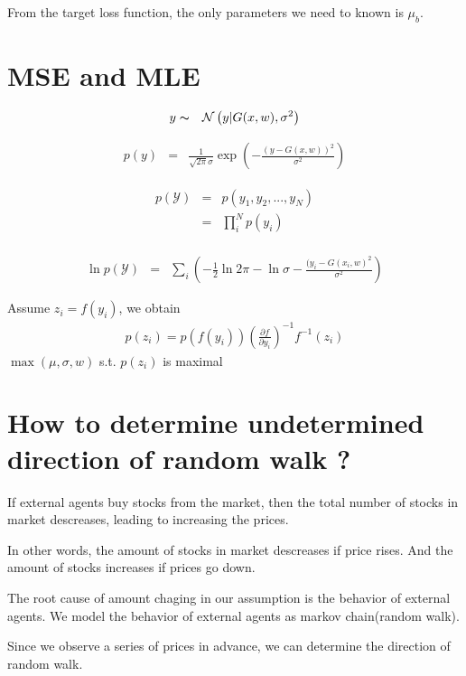 \documentclass[11pt]{article}
\begin{document}
From the target loss function, the only parameters we need to known is \(\mu_b\).
\section{MSE and MLE}
\label{sec:org63f4234}

\begin{eqnarray}
y &\thicksim& \mathcal{N} \left( y | G(x, w), \sigma^2 \right)
\end{eqnarray}

\begin{eqnarray}
p(y) &=& \frac{1}{\sqrt{2 \pi} \sigma} \exp \left(-\frac{(y-G(x, w))^2}{\sigma^2} \right)
\end{eqnarray}

\begin{eqnarray}
p(\mathcal{Y}) &=& p (y_1, y_2, ..., y_N) \\
               &=& \prod_{i}^N p(y_i) \\
\end{eqnarray}

\begin{eqnarray}
\ln p(\mathcal{Y}) &=& \sum_{i} \left( -\frac{1}{2}\ln 2 \pi - \ln \sigma - \frac{(y_i - G(x_i, w)^2}{\sigma^2} \right)
\end{eqnarray}

Assume \(z_i = f(y_i)\), we obtain
\begin{eqnarray}
p(z_i) = p(f(y_i)) \left(\frac{\partial f}{\partial y_i}\right)^{-1} f^{-1}(z_i)
\end{eqnarray}
\(\max (\mu, \sigma, w)\) s.t. \(p(z_i)\) is maximal

\section{How to determine undetermined direction of random walk ?}
\label{sec:org42ba02d}
If external agents buy stocks from the market, then the total number of stocks in market descreases, leading to increasing the prices.

In other words, the amount of stocks in market descreases if price rises. And the amount of stocks increases if prices go down.

The root cause of amount chaging in our assumption is the behavior of external agents.
We model the behavior of external agents as markov chain(random walk).

Since we observe a series of prices in advance, we can determine the direction of random walk.
\end{document}

